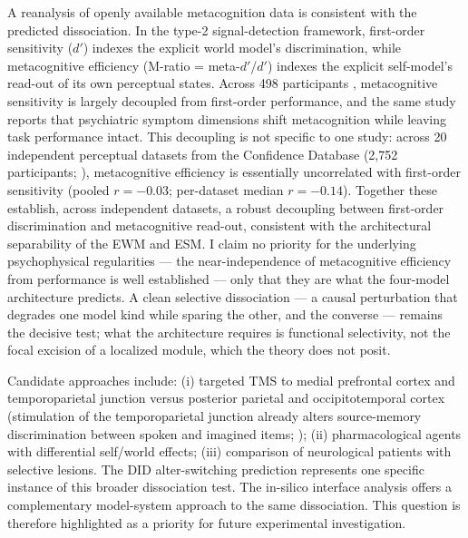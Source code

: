 \documentclass[12pt]{article}
\newcommand{\revstart}{}
\newcommand{\revend}{}
\begin{document}
{{\revstart A reanalysis of openly available metacognition data is consistent with the predicted dissociation. In the type-2 signal-detection framework, first-order sensitivity ($d'$) indexes the explicit world model's discrimination, while metacognitive efficiency (M-ratio = meta-$d'$/$d'$) indexes the explicit self-model's read-out of its own perceptual states. Across 498 participants \citep{Rouault2018}, metacognitive sensitivity is largely decoupled from first-order performance, and the same study reports that psychiatric symptom dimensions shift metacognition while leaving task performance intact. This decoupling is not specific to one study: across 20 independent perceptual datasets from the Confidence Database (2{,}752 participants; \citealp{Rahnev2020}), metacognitive efficiency is essentially uncorrelated with first-order sensitivity (pooled $r = -0.03$; per-dataset median $r = -0.14$). Together these establish, across independent datasets, a robust decoupling between first-order discrimination and metacognitive read-out, consistent with the architectural separability of the EWM and ESM. I claim no priority for the underlying psychophysical regularities --- the near-independence of metacognitive efficiency from performance is well established \citep{FlemingLau2014} --- only that they are what the four-model architecture predicts. A clean selective dissociation --- a causal perturbation that degrades one model kind while sparing the other, and the converse --- remains the decisive test; what the architecture requires is functional selectivity, not the focal excision of a localized module, which the theory does not posit.\revend}

Candidate approaches include: (i) targeted TMS to medial prefrontal cortex and temporoparietal junction versus posterior parietal and occipitotemporal cortex (stimulation of the temporoparietal junction already alters source-memory discrimination between spoken and imagined items; \citealp{Bates2026}); (ii) pharmacological agents with differential self/world effects; (iii) comparison of neurological patients with selective lesions. The DID alter-switching prediction represents one specific instance of this broader dissociation test. The in-silico interface analysis offers a complementary model-system approach to the same dissociation. This question is therefore highlighted as a priority for future experimental investigation.\revend}
\end{document}
